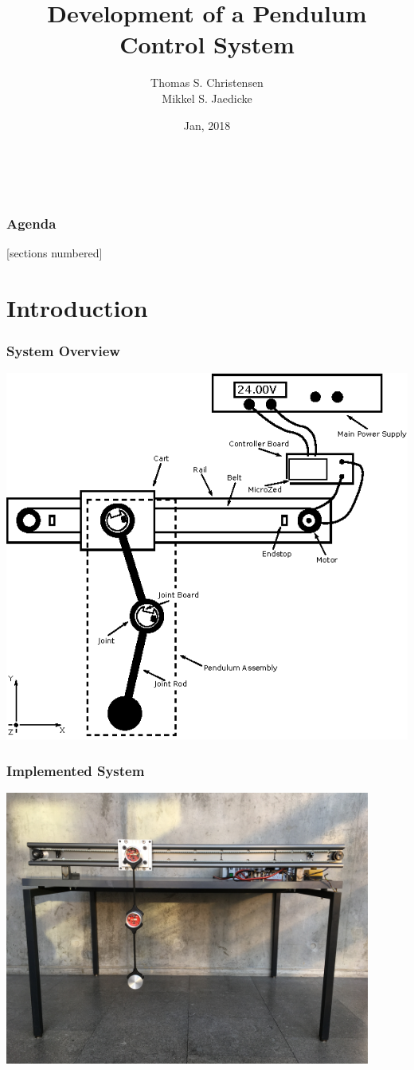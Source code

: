 \documentclass[mathserif]{beamer}
\title{Development of a Pendulum Control System}
\author{Thomas S. Christensen \\ Mikkel S. Jaedicke\\}
\institute{University of Southern Denmark}
\date{Jan, 2018}
\begin{document}
\begin{frame}[t]\frametitle{~}
\maketitle
\end{frame}

\begin{frame}[c]\frametitle{Agenda}
[sections numbered]
\tableofcontents[hideallsubsections]
\end{frame}


\section{Introduction}

\begin{frame}[c]\frametitle{System Overview}

\centering
\includegraphics[scale=1]{graphics/system_overview}
\end{frame}

\begin{frame}[c]\frametitle{Implemented System}
\centering
\includegraphics[width=0.9\textwidth]{graphics/full_system_finish}
\end{frame}
\end{document}
